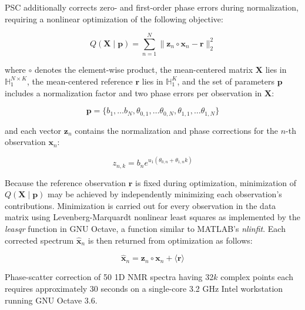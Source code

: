 \begin{doublespace}
PSC additionally corrects zero- and first-order phase errors during
normalization, requiring a nonlinear optimization of the following objective:

\begin{equation}
Q(\mathbf{X} \mid \mathbf{p})
 = \sum_{n=1}^N \| \mathbf{z}_n \circ \mathbf{x}_n - \mathbf{r} \|_2^2
\end{equation}

where $\circ$ denotes the element-wise product, the mean-centered matrix
$\mathbf{X}$ lies in $\mathbb{H}_1^{N \times K}$, the mean-centered reference
$\mathbf{r}$ lies in $\mathbb{H}_1^K$, and the set of parameters $\mathbf{p}$
includes a normalization factor and two phase errors per observation
in $\mathbf{X}$:

\begin{equation}
\mathbf{p} = \{
  b_1, \dots b_N,
  \theta_{0,1}, \dots \theta_{0,N},
  \theta_{1,1}, \dots \theta_{1,N} \}
\end{equation}

and each vector $\mathbf{z}_n$ contains the normalization and phase corrections
for the $n$-th observation $\mathbf{x}_n$:

\begin{equation}
z_{n,k} = b_n e^{u_1 (\theta_{0,n} + \theta_{1,n} k)}
\end{equation}

Because the reference observation $\mathbf{r}$ is fixed during optimization,
minimization of $Q(\mathbf{X} \mid \mathbf{p})$ may be achieved by
independently minimizing each observation's contributions. Minimization is
carried out for every observation in the data matrix using Levenberg-Marquardt
nonlinear least squares \cite{marquardt:jsiam1963} as implemented by the
{\it leasqr} function in GNU Octave, a function similar to MATLAB's
{\it nlinfit}. Each corrected spectrum $\hat{\mathbf{x}}_n$ is then returned
from optimization as follows:

\begin{equation}
\hat{\mathbf{x}}_n
 = \mathbf{z}_n \circ \mathbf{x}_n
 + \langle \mathbf{r} \rangle
\end{equation}

Phase-scatter correction of 50 1D \hnmr{} NMR spectra having 32$k$ complex
points each requires approximately 30 seconds on a single-core 3.2 GHz Intel
workstation running GNU Octave 3.6.
\end{doublespace}

